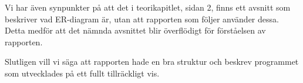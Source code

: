 \documentclass[a4paper, 12pt]{article}
\begin{document}
Vi har även synpunkter på att det i teorikapitlet, sidan 2, finns ett avsnitt som beskriver vad ER-diagram är, utan att rapporten som följer använder dessa. Detta medför att det nämnda avsnittet blir överflödigt för förståelsen av rapporten.

Slutligen vill vi säga att rapporten hade en bra struktur och beskrev programmet som utvecklades på ett fullt tillräckligt vis. 
\end{document}
